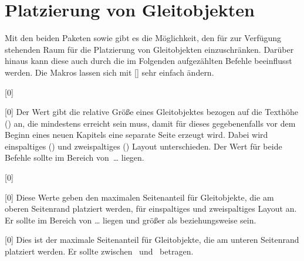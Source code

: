 \section{Platzierung von Gleitobjekten}
%
%
%
Mit den beiden Paketen  sowie  gibt es die 
Möglichkeit, den für  zur Verfügung stehenden Raum für die 
Platzierung von Gleitobjekten einzuschränken. Darüber hinaus kann diese auch 
durch die im Folgenden aufgezählten Befehle beeinflusst werden. Die Makros 
lassen sich mit [] 
sehr einfach ändern.

\begin{Declaration}{}[0\floatpagefraction]
\begin{Declaration}{}[0\dblfloatpagefraction]
\printdeclarationlist%
%
Der Wert gibt die relative Größe eines Gleitobjektes bezogen auf die Texthöhe 
() an, die mindestens erreicht sein muss, damit für dieses 
gegebenenfalls vor dem Beginn eines neuen Kapitels eine separate Seite erzeugt 
wird. Dabei wird einspaltiges () und zweispaltiges 
() Layout unterschieden. Der Wert für beide 
Befehle sollte im Bereich von~\dots{} liegen.
\end{Declaration}
\end{Declaration}

\begin{Declaration}{}[0\topfraction]
\begin{Declaration}{}[0\dbltopfraction]
\printdeclarationlist%
%
Diese Werte geben den maximalen Seitenanteil für Gleitobjekte, die am oberen 
Seitenrand platziert werden, für einspaltiges und zweispaltiges Layout an. Er 
sollte im Bereich von \dots{} liegen und größer als 
 beziehungsweise  sein.
\end{Declaration}
\end{Declaration}

\begin{Declaration}{}[0\bottomfraction]
\printdeclarationlist%
%
Dies ist der maximale Seitenanteil für Gleitobjekte, die am unteren Seitenrand 
platziert werden. Er sollte zwischen~ und~ betragen.
\end{Declaration}


